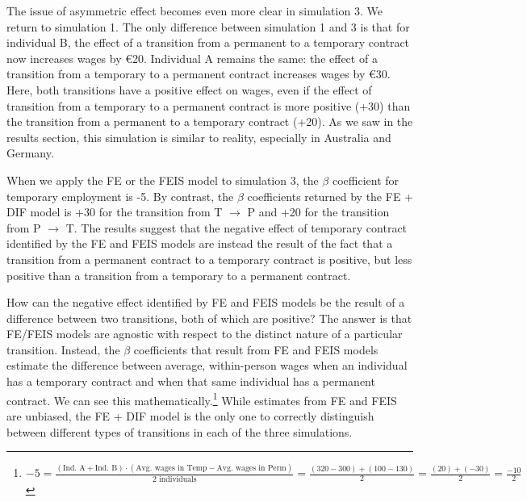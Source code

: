 The issue of asymmetric effect becomes even more clear in simulation 3. We return to simulation 1.  The only difference between simulation 1 and 3 is that for individual B, the effect of a transition from a permanent to a temporary contract now increases wages by €20.  Individual A remains the same: the effect of a transition from a temporary to a permanent contract increases wages by €30.  Here, both transitions have a positive effect on wages, even if the effect of transition from a temporary to a permanent contract is more positive (+30) than the transition from a permanent to a temporary contract (+20).  As we saw in the results section, this simulation is similar to reality, especially in Australia and Germany.  

When we apply the FE or the FEIS model to simulation 3, the $\beta$ coefficient for temporary employment is -5.  By contrast, the $\beta$ coefficients returned by the FE + DIF model is +30 for the transition from T  $\rightarrow$ P and +20 for the transition from P  $\rightarrow$ T.  The results suggest that the negative effect of temporary contract identified by the FE and FEIS models are instead the result of the fact that a transition from a permanent contract to a temporary contract is positive, but less positive than a transition from a temporary to a permanent contract.  

How can the negative effect identified by FE and FEIS models be the result of a difference between two transitions, both of which are positive?  The answer is that FE/FEIS models are agnostic with respect to the distinct nature of a particular transition.  Instead, the $\beta$ coefficients that result from FE and FEIS models estimate the difference between average, within-person wages when an individual has a temporary contract and when that same individual has a permanent contract.  We can see this mathematically.\footnote{$-5 = \frac{(\text{Ind. A} + \text{Ind. B}) \cdot (\text{Avg. wages in Temp} - \text{Avg. wages in Perm})}{2 \text{ individuals}} = \frac{(320-300) + (100-130)}{2} = \frac{(20) + (-30)}{2} = \frac{-10}{2}$}   While estimates from FE and FEIS are unbiased, the FE + DIF model is the only one to correctly distinguish between different types of transitions in each of the three simulations.

